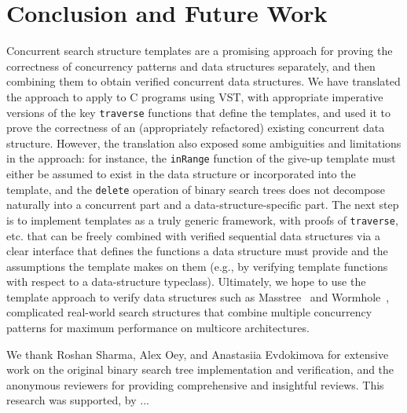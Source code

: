 \documentclass[sigplan,10pt, screen]{acmart}
\newcommand{\wm}[1]{\textbf{\textcolor{violet}{[William: #1]}}}
\begin{document}



\section{Conclusion and Future Work}
Concurrent search structure templates are a promising approach for proving the correctness of concurrency patterns and data structures separately, and then combining them to obtain verified concurrent data structures. We have translated the approach to apply to C programs using VST, with appropriate imperative versions of the key \lstinline{traverse} functions that define the templates, and used it to prove the correctness of an (appropriately refactored) existing concurrent data structure. However, the translation also exposed some ambiguities and limitations in the approach: for instance, the \lstinline{inRange} function of the give-up template must either be assumed to exist in the data structure or incorporated into the template, and the \lstinline{delete} operation of binary search trees does not decompose naturally into a concurrent part and a data-structure-specific part.  %
The next step is to implement templates as a truly generic framework, with proofs of \lstinline{traverse}, etc. that can be freely combined with verified sequential data structures via a clear interface that defines the functions a data structure must provide and the assumptions the template makes on them (e.g., by verifying template functions with respect to a data-structure typeclass).
Ultimately, we hope to use the template approach to verify data structures such as Masstree~\cite{masstree} and Wormhole~\cite{wormhole}, complicated real-world search structures that combine multiple concurrency patterns for maximum performance on multicore architectures.



\begin{acks}
We thank Roshan Sharma, Alex Oey, and Anastasiia Evdokimova for extensive work on the original binary search tree implementation and verification, and the anonymous reviewers for providing comprehensive and insightful reviews.
This research was supported, by ... 
\end{acks}

\end{document}
